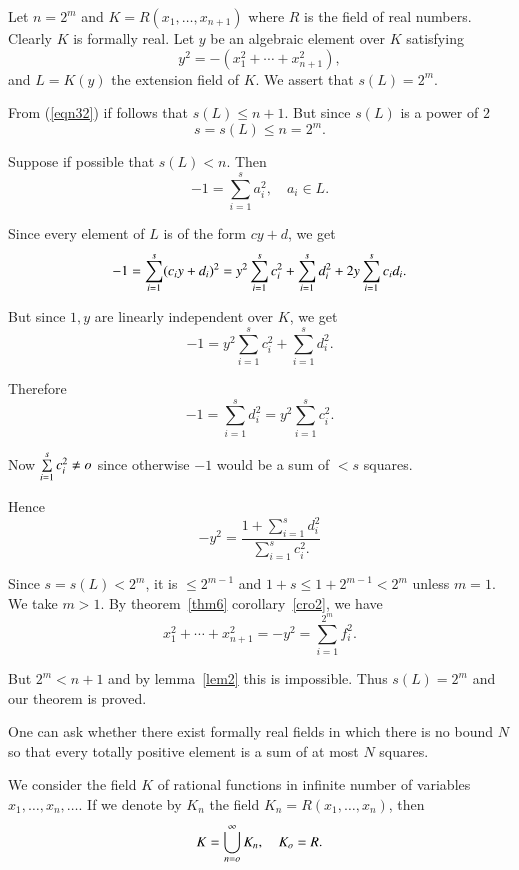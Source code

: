 \begin{Proof}
Let $n=2^{m}$ and $K=R(x_1,\ldots,x_{n+1})$ where $R$ is the field of
real numbers. Clearly $K$ is formally real. Let $y$ be an algebraic
element over $K$ satisfying 
\begin{equation}\label{eqn32}
y^{2}=-\left(x^{2}_1+\cdots+ x^{2}_{n+1}\right),
\end{equation}
and $L=K(y)$ the extension field of $K$. We assert that $s(L)=2^{m}$.

From (\ref{eqn32}) if follows that $s(L)\leq n+1$. But since $s(L)$ is
a power of $2$
$$
s=s(L)\leq n=2^{m}.
$$

Suppose if possible that $s(L)<n$. Then
$$
-1=\sum\limits_{i=1}^{s}a^{2}_i,\quad a_i\in L.
$$ 

Since every element of $L$ is of the form $cy+d$, we get 
\begin{equation*}
-1= \sum\limits_{i=1}^{s}(c_iy+d_i)^{2}=y^{2}\sum\limits_{i=1}^{s}c^{2}_i+\sum\limits_{i=1}^{s}d^{2}_i+2y\sum\limits_{i=1}^{s}c_id_i.\\
\end{equation*}

But since $1,y$ are linearly independent over $K$, we get
$$
-1=y^{2}\sum\limits_{i=1}^{s}c^{2}_i+\sum\limits_{i=1}^{s}d^{2}_i.
$$

Therefore
$$
-1=\sum\limits_{i=1}^{s}d^{2}_i=y^{2}\sum\limits_{i=1}^{s}c^{2}_i.
$$

Now $\sum\limits_{i=1}^{s} c^{2}_i\neq o$ since otherwise $-1$ would
be a sum of $<s$ squares.

Hence
$$
-y^{2}=\dfrac{1+\sum\limits_{i=1}^{s}d^{2}_i}{\sum\limits_{i=1}^{s} c^{2}_i.}
$$

Since $s=s(L)<2^{m}$, it is $\leq 2^{m-1}$ and $1+s\leq
1+2^{m-1}<2^{m}$ unless $m=1$. We take $m>1$. By theorem~\ref{thm6}
corollary~\ref{cro2}, we have 
$$
x^{2}_1+\cdots +x^{2}_{n+1}=-y^{2}=\sum\limits_{i=1}^{2^{m}}f^{2}_i.
$$

But $2^{m}<n+1$ and by lemma~\ref{lem2} this is impossible. Thus
$s(L)=2^{m}$ and our theorem is proved.
\enprf
\end{Proof}


One can ask whether there exist formally real fields in which there is
no bound $N$ so that every totally positive element is a sum of at
most $N$ squares.

We consider the field $K$ of rational functions in infinite number of
variables $x_1,\ldots,x_n,\ldots$. If we denote by $K_n$ the
field $K_n=R(x_1,\ldots,x_n)$, then 
$$
K=\bigcup\limits_{n=o}^{\infty} K_n, \quad K_{o}=R.
$$

